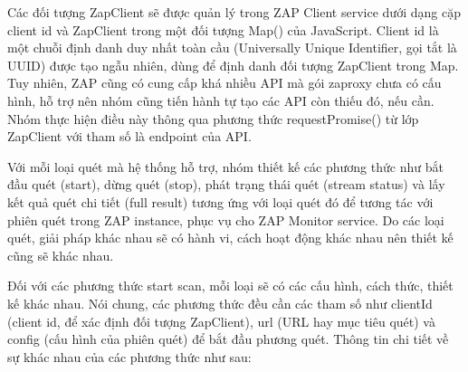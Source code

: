 Các đối tượng ZapClient sẽ được quản lý trong ZAP Client service dưới dạng cặp client id và ZapClient trong một đối tượng Map() của JavaScript. Client id là một chuỗi định danh duy nhất toàn cầu (Universally Unique Identifier, gọi tắt là UUID) được tạo ngẫu nhiên, dùng để định danh đối tượng ZapClient trong Map. Tuy nhiên, ZAP cũng có cung cấp khá nhiều API mà gói zaproxy chưa có cấu hình, hỗ trợ nên nhóm cũng tiến hành tự tạo các API còn thiếu đó, nếu cần. Nhóm thực hiện điều này thông qua phương thức requestPromise() từ lớp ZapClient với tham số là endpoint của API.

Với mỗi loại quét mà hệ thống hỗ trợ, nhóm thiết kế các phương thức như bắt đầu quét (start), dừng quét (stop), phát trạng thái quét (stream status) và lấy kết quả quét chi tiết (full result) tương ứng với loại quét đó để tương tác với phiên quét trong ZAP instance, phục vụ cho ZAP Monitor service. Do các loại quét, giải pháp khác nhau sẽ có hành vi, cách hoạt động khác nhau nên thiết kế cũng sẽ khác nhau.
\par

Đối với các phương thức start scan, mỗi loại sẽ có các cấu hình, cách thức, thiết kế khác nhau. Nói chung, các phương thức đều cần các tham số như clientId (client id, để xác định đối tượng ZapClient), url (URL hay mục tiêu quét) và config (cấu hình của phiên quét) để bắt đầu phương quét. Thông tin chi tiết về sự khác nhau của các phương thức như sau:
\par

